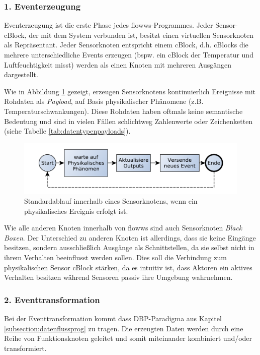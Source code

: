 \subsubsection{1. Eventerzeugung}
 Eventerzeugung ist die erste Phase jedes flowws-Programmes. Jeder Sensor-cBlock, der mit dem System verbunden ist, besitzt einen virtuellen Sensorknoten als Repräsentant. Jeder Sensorknoten entspricht einem cBlock, d.h. cBlocks die mehrere unterschiedliche Events erzeugen (bspw. ein cBlock der Temperatur und Luftfeuchtigkeit misst) werden als einen Knoten mit mehreren Ausgängen dargestellt. 
 
 Wie in Abbildung \ref{fig:seqsensorblock} gezeigt, erzeugen Sensorknotens kontinuierlich Ereignisse mit Rohdaten als \textit{Payload}, auf Basis physikalischer Phänomene (z.B. Temperaturschwankungen). Diese Rohdaten haben oftmals keine semantische Bedeutung und sind in vielen Fällen schlichtweg Zahlenwerte oder Zeichenketten (siehe Tabelle \ref{tab:datentypenpayloads}).
 
 \begin{figure}[h]
  \centering
  \includegraphics[width=1\textwidth]{bilder/chapter4/chapter4_2/sensorblockablauf.pdf}
  \caption{Standardablauf innerhalb eines Sensorknotens, wenn ein physikalisches Ereignis erfolgt ist.}
  \label{fig:seqsensorblock}
\end{figure}

 Wie alle anderen Knoten innerhalb von flowws sind auch Sensorknoten \textit{Black Boxen}. Der Unterschied zu anderen Knoten ist allerdings, dass sie keine Eingänge besitzen, sondern ausschließlich Ausgänge als Schnittstellen, da sie selbst nicht in ihrem Verhalten beeinflusst werden sollen. Dies soll die Verbindung zum physikalischen Sensor cBlock stärken, da es intuitiv ist, dass Aktoren ein aktives Verhalten besitzen während Sensoren passiv ihre Umgebung wahrnehmen. 
 
 \subsubsection{2. Eventtransformation}\label{subsubsec:eventtrans}
 Bei der Eventtransformation kommt dass \ac{DBP}-Paradigma aus Kapitel \ref{subsection:datenflussprog} zu tragen. Die erzeugten Daten werden durch eine Reihe von Funktionsknoten geleitet und somit miteinander kombiniert und/oder transformiert. 
 
